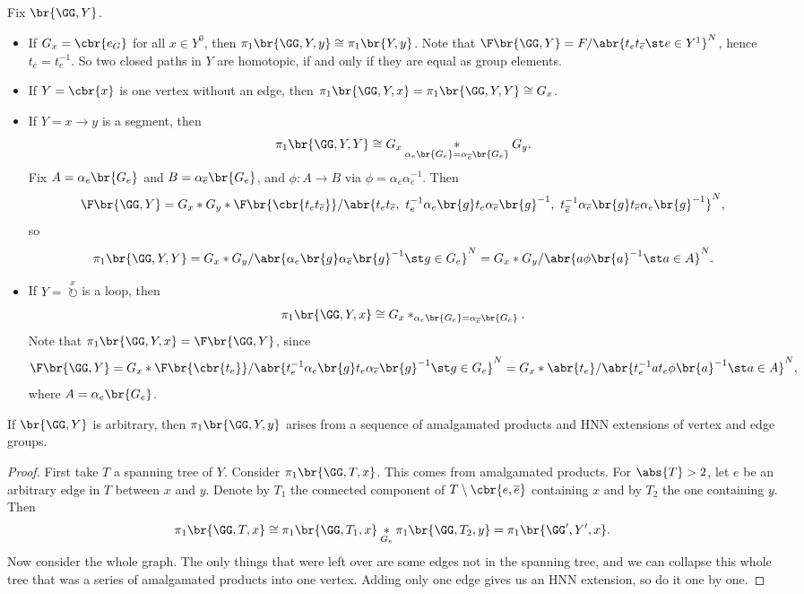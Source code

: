 \begin{example}
Fix $ \br{\GG, Y} $.
\begin{itemize}
\item If $ G_x = \cbr{e_G} $ for all $ x \in Y^0 $, then $ \pi_1\br{\GG, Y, y} \cong \pi_1\br{Y, y} $. Note that $ \F\br{\GG, Y} = F / \abr{t_et_{\overline{e}} \st e \in Y^1}^N $, hence $ t_{\overline{e}} = t_e^{-1} $. So two closed paths in $ Y $ are homotopic, if and only if they are equal as group elements.
\item If $ Y = \cbr{x} $ is one vertex without an edge, then $ \pi_1\br{\GG, Y, x} = \pi_1\br{\GG, Y, Y} \cong G_x $.
\item If $ Y = x \to y $ is a segment, then
$$ \pi_1\br{\GG, Y, Y} \cong G_x \underset{\alpha_e\br{G_e} = \alpha_{\overline{e}}\br{G_e}}{*} G_y. $$
Fix $ A = \alpha_e\br{G_e} $ and $ B = \alpha_{\overline{e}}\br{G_e} $, and $ \phi : A \to B $ via $ \phi = \alpha_{\overline{e}}\alpha_e^{-1} $. Then
$$ \F\br{\GG, Y} = G_x * G_y * \F\br{\cbr{t_et_{\overline{e}}}} / \abr{t_et_{\overline{e}}, \ t_e^{-1}\alpha_e\br{g}t_e\alpha_{\overline{e}}\br{g}^{-1}, \ t_{\overline{e}}^{-1}\alpha_{\overline{e}}\br{g}t_{\overline{e}}\alpha_e\br{g}^{-1}}^N, $$
so
$$ \pi_1\br{\GG, Y, Y} = G_x * G_y / \abr{\alpha_e\br{g}\alpha_{\overline{e}}\br{g}^{-1} \st g \in G_e}^N = G_x * G_y / \abr{a\phi\br{a}^{-1} \st a \in A}^N. $$
\item If $ Y = \ \overset{x}{\circlearrowright} $ is a loop, then
$$ \pi_1\br{\GG, Y, x} \cong G_x *_{\alpha_e\br{G_e} = \alpha_{\overline{e}}\br{G_e}}. $$
Note that $ \pi_1\br{\GG, Y, x} = \F\br{\GG, Y} $, since
$$ \F\br{\GG, Y} = G_x * \F\br{\cbr{t_e}} / \abr{t_e^{-1}\alpha_e\br{g}t_e\alpha_{\overline{e}}\br{g}^{-1} \st g \in G_e}^N = G_x * \abr{t_e} / \abr{t_e^{-1}at_e\phi\br{a}^{-1} \st a \in A}^N, $$
where $ A = \alpha_e\br{G_e} $.
\end{itemize}
\end{example}

\begin{lemma}
\label{lem:2.6.7}
If $ \br{\GG, Y} $ is arbitrary, then $ \pi_1\br{\GG, Y, y} $ arises from a sequence of amalgamated products and HNN extensions of vertex and edge groups.
\end{lemma}

\begin{proof}
First take $ T $ a spanning tree of $ Y $. Consider $ \pi_1\br{\GG, T, x} $. This comes from amalgamated products. For $ \abs{T} > 2 $, let $ e $ be an arbitrary edge in $ T $ between $ x $ and $ y $. Denote by $ T_1 $ the connected component of $ T \setminus \cbr{e, \overline{e}} $ containing $ x $ and by $ T_2 $ the one containing $ y $. Then
$$ \pi_1\br{\GG, T, x} \cong \pi_1\br{\GG, T_1, x} \underset{G_e}{*} \pi_1\br{\GG, T_2, y} = \pi_1\br{\GG', Y', x}. $$
Now consider the whole graph. The only things that were left over are some edges not in the spanning tree, and we can collapse this whole tree that was a series of amalgamated products into one vertex. Adding only one edge gives us an HNN extension, so do it one by one.
\end{proof}

